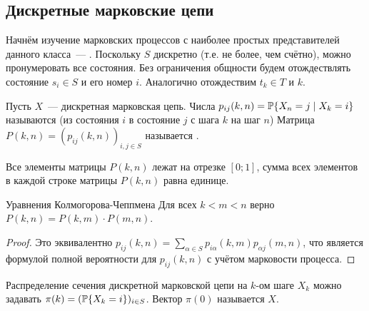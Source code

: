 \FloatBarrier




\subsection{Дискретные марковские цепи} \label{subsection:markov:markov_chains}

Начнём изучение марковских процессов с наиболее простых представителей данного класса~--- .
Поскольку $ S $ дискретно (т.е. не более, чем счётно),
можно пронумеровать все состояния.
Без ограничения общности будем отождествлять состояние $ s_i \in S $ и его номер $ i $.
Аналогично отождествим $ t_k \in T $ и $ k $.

\begin{definition}
    \label{definition:markov:transition_matrix}
    Пусть $ X $~--- дискретная марковская цепь.
    Числа $ p_{ij}(k, n) = \mathbb{P} \{X_n = j \mid X_k = i \} $ называются 
    (из состояния $ i $ в состояние $ j $ с шага $ k $ на шаг $ n $)
    Матрица $ P(k,n) = (p_{ij}(k,n))_{i,j \in S} $ называется .
\end{definition}

\begin{remark}
    \label{remark:markov:transition_matrix_basic_properties}
    Все элементы матрицы $ P(k,n) $ лежат на отрезке $ [0;1] $,
    сумма всех элементов в каждой строке матрицы $ P(k,n) $ равна единице.
\end{remark}

\begin{statement}{Уравнения Колмогорова-Чеппмена}
    \label{statement:markov:Kolmogorov-Chapman_equations}
    Для всех $ k < m < n $ верно $ P(k,n) = P(k,m) \cdot P(m,n) $.
\end{statement}

\begin{proof}
    Это эквивалентно $ p_{ij}(k,n) = \sum_{\alpha \in S} p_{i \alpha}(k,m) p_{\alpha j}(m,n) $,
    что является формулой полной вероятности для $ p_{ij}(k,n) $ с учётом марковости процесса.
\end{proof}

\begin{definition}
    \label{definition:markov:distribution_vector}
    Распределение сечения дискретной марковской цепи на $ k $-ом шаге $ X_k $ можно задавать
     $ \pi(k) = (\mathbb{P} \{ X_k = i \})_{i \in S} $.
    Вектор $ \pi(0) $ называется  $ X $.
\end{definition}

